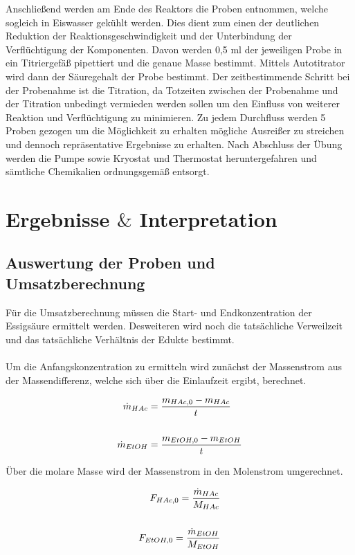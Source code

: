 \documentclass[12pt,liststotoc]{report}
\begin{document}
Anschließend werden am Ende des Reaktors die Proben entnommen, welche sogleich in Eiswasser gekühlt werden. Dies dient zum einen der deutlichen Reduktion der Reaktionsgeschwindigkeit und der Unterbindung der Verflüchtigung der Komponenten. Davon werden 0,5 $\text{ml}$ der jeweiligen Probe in ein Titriergefäß pipettiert und die genaue Masse bestimmt. Mittels Autotitrator wird dann der Säuregehalt der Probe bestimmt.
Der  zeitbestimmende Schritt bei der Probenahme ist die Titration, da Totzeiten zwischen der Probenahme und der Titration unbedingt vermieden werden sollen um den Einfluss von weiterer Reaktion und Verflüchtigung zu minimieren.
Zu jedem Durchfluss werden 5 Proben gezogen um die Möglichkeit zu erhalten mögliche Ausreißer zu streichen und dennoch repräsentative Ergebnisse zu erhalten.
Nach Abschluss der Übung werden die Pumpe sowie Kryostat und Thermostat heruntergefahren und sämtliche Chemikalien ordnungsgemäß entsorgt.




\chapter{Ergebnisse $\&$ Interpretation}

\section{Auswertung der Proben und Umsatzberechnung}
\label{auswertungundumsatzberechnung}

Für die Umsatzberechnung müssen die Start- und Endkonzentration der Essigsäure ermittelt werden. Desweiteren wird noch die tatsächliche Verweilzeit und das tatsächliche Verhältnis der Edukte bestimmt.\\
\\
Um die Anfangskonzentration zu ermitteln wird zunächst der Massenstrom aus der Massendifferenz, welche sich über die Einlaufzeit ergibt, berechnet.

\begin{align}
    \dot{m}_{HAc} &= \frac{m_{HAc, 0} - m_{HAc}}{t}\\
    \notag\\
    \dot{m}_{EtOH} &= \frac{m_{EtOH, 0} - m_{EtOH}}{t}
\end{align}

Über die molare Masse wird der Massenstrom in den Molenstrom umgerechnet.

\begin{align}
    F_{HAc,0} = \frac{\dot{m}_{HAc}}{M_{HAc}}\\
    \notag\\
    F_{EtOH,0} = \frac{\dot{m}_{EtOH}}{M_{EtOH}}
\end{align}
\end{document}
